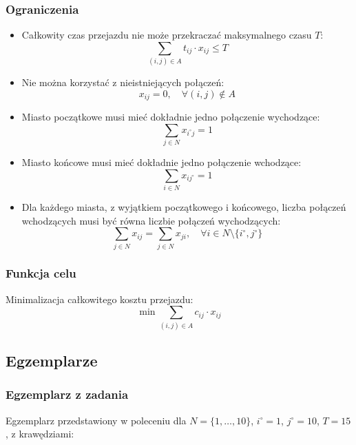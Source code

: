 \documentclass{article}
\begin{document}
\subsubsection{Ograniczenia}
\begin{itemize}
    \item Całkowity czas przejazdu nie może przekraczać maksymalnego czasu $T$:
    \[
    \sum_{(i, j) \in A} t_{ij} \cdot x_{ij} \leq T
    \]
    \item Nie można korzystać z nieistniejących połączeń:
    \[
    x_{ij} = 0, \quad \forall (i, j) \notin A
    \]
    \item Miasto początkowe musi mieć dokładnie jedno połączenie wychodzące:
    \[
    \sum_{j \in N} x_{i^\circ j} = 1
    \]
    \item Miasto końcowe musi mieć dokładnie jedno połączenie wchodzące:
    \[
    \sum_{i \in N} x_{i j^\circ} = 1
    \]
    \item Dla każdego miasta, z wyjątkiem początkowego i końcowego, liczba połączeń wchodzących musi być równa liczbie połączeń wychodzących:
    \[
    \sum_{j \in N} x_{ij} = \sum_{j \in N} x_{ji}, \quad \forall i \in N \setminus \{i^\circ, j^\circ\}
    \]
\end{itemize}

\subsubsection{Funkcja celu}
Minimalizacja całkowitego kosztu przejazdu:
\[
\min \sum_{(i, j) \in A} c_{ij} \cdot x_{ij}
\]

\subsection{Egzemplarze}
\subsubsection{Egzemplarz z zadania}
Egzemplarz przedstawiony w poleceniu dla $N = \{1, \ldots, 10\}$, $i^\circ = 1$, $j^\circ = 10$, $T = 15$, z krawędziami:
\end{document}
